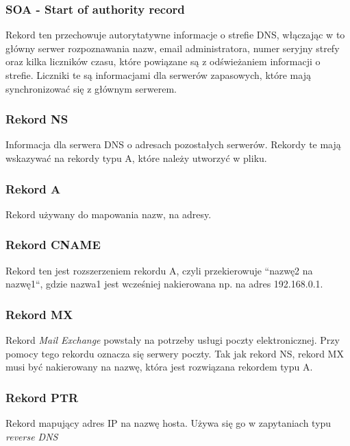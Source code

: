 \documentclass[12pt, a4paper]{article}
\begin{document}
        \subsubsection{SOA - Start of authority record}
            Rekord ten przechowuje autorytatywne informacje o strefie DNS, włączając w to główny serwer rozpoznawania nazw, email administratora, numer seryjny strefy oraz kilka liczników czasu, które powiązane są z odświeżaniem informacji o strefie. Liczniki te są informacjami dla serwerów zapasowych, które mają synchronizować się z głównym serwerem.
            
        \subsubsection{Rekord NS}
            Informacja dla serwera DNS o adresach pozostałych serwerów. Rekordy te mają wskazywać na rekordy typu A, które należy utworzyć w pliku.
            
        \subsubsection{Rekord A}
            Rekord używany do mapowania nazw, na adresy.
            
        \subsubsection{Rekord CNAME}
            Rekord ten jest rozszerzeniem rekordu A, czyli przekierowuje ``nazwę2 na nazwę1``, gdzie nazwa1 jest wcześniej nakierowana np. na adres 192.168.0.1.
            
        \subsubsection{Rekord MX}
            Rekord \textit{Mail Exchange} powstały na potrzeby usługi poczty elektronicznej. Przy pomocy tego rekordu oznacza się serwery poczty. Tak jak rekord NS, rekord MX musi być nakierowany na nazwę, która jest rozwiązana rekordem typu A.
            
        \subsubsection{Rekord PTR}
            Rekord mapujący adres IP na nazwę hosta. Używa się go w zapytaniach typu \textit{reverse DNS}
\newpage
\end{document}
